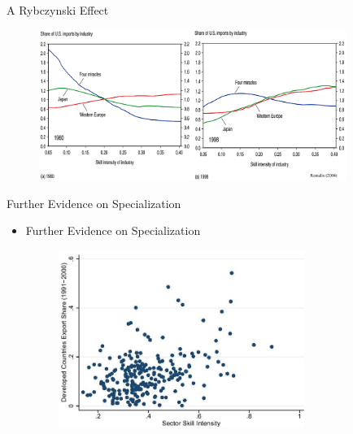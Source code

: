 \documentclass[10pt,hyperref={CJKbookmarks=true},xcolor=dvipsnames,aspectratio=169]{beamer}
\begin{document}
\begin{frame}{A Rybczynski Effect }


\begin{figure}


\begin{centering}
\includegraphics[width=10cm]{fig/ho/lec5-13}
\par\end{centering}

\end{figure}

\end{frame}

\begin{frame}{Further Evidence on Specialization}

\begin{itemize}
\item Further Evidence on Specialization
\begin{figure}


\begin{centering}
\includegraphics[width=8cm]{fig/ho/lec5-14}
\par\end{centering}

\end{figure}

\end{itemize}
\end{frame}
\end{document}
